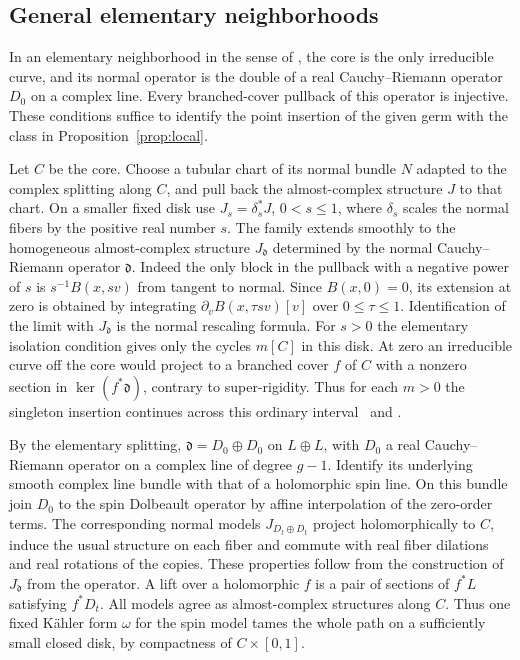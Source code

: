 \subsection{General elementary neighborhoods}
In an elementary neighborhood in the sense of
\cite[Definition~3.1]{IP}, the core is the only irreducible curve,
and its normal operator is the double of a real Cauchy--Riemann
operator $D_0$ on a complex line. Every branched-cover pullback of
this operator is injective. These conditions suffice to identify the
point insertion of the given germ with the class in
Proposition~\ref{prop:local}.

Let $C$ be the core. Choose a tubular chart of its normal bundle
$N$ adapted to the complex splitting along $C$, and pull back
the almost-complex structure $J$ to that chart. On a smaller fixed
disk use $J_s=\delta_s^*J$, $0<s\leq1$, where $\delta_s$ scales
the normal fibers by the positive real number $s$. The family
extends smoothly to the homogeneous almost-complex structure
$J_{\mathfrak d}$ determined by the normal Cauchy--Riemann
operator $\mathfrak d$. Indeed the only block in the pullback with
a negative power of $s$ is $s^{-1}B(x,sv)$ from tangent to normal. Since
$B(x,0)=0$, its extension at zero is obtained by integrating
$\partial_v B(x,\tau sv)[v]$ over $0\leq\tau\leq1$. Identification
of the limit with $J_{\mathfrak d}$ is the normal rescaling formula.
For $s>0$ the elementary isolation condition gives only the cycles
$m[C]$ in this disk. At zero an irreducible curve off the core
would project to a branched cover $f$ of $C$ with a nonzero section
in $\ker(f^*\mathfrak d)$, contrary to super-rigidity. Thus for
each $m>0$ the singleton insertion continues across this ordinary
interval~\cite[Lemmas~3.6 and~3.10 and Proposition~3.12]{DW} and
\cite[Definition 3.1]{IP}.

By the elementary splitting, $\mathfrak d=D_0\oplus D_0$ on
$L\oplus L$, with $D_0$ a real Cauchy--Riemann operator on a
complex line of degree $g-1$. Identify its underlying smooth
complex line bundle with that of a holomorphic spin line. On
this bundle join $D_0$ to the spin Dolbeault operator by affine
interpolation of the zero-order terms. The corresponding normal
models $J_{D_t\oplus D_t}$ project holomorphically to $C$, induce
the usual structure on each fiber and commute with real fiber
dilations and real rotations of the copies. These properties follow
from the construction of $J_{\mathfrak d}$ from the operator. A lift over a holomorphic $f$ is a pair of sections of
$f^*L$ satisfying $f^*D_t$. All models agree as almost-complex
structures along $C$. Thus one fixed Kähler form $\omega$ for the spin model
tames the whole path on a sufficiently small closed disk, by
compactness of $C\times[0,1]$.

